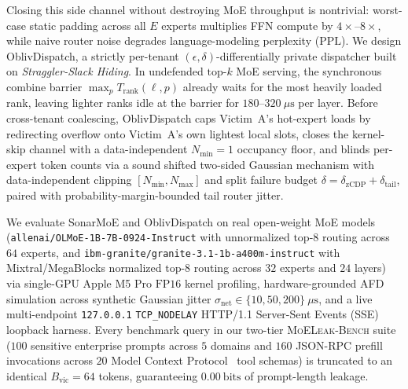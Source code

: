 \documentclass[final,5p,times,twocolumn]{elsarticle}
\def\SM{SonarMoE}%
\def\OD{OblivDispatch}%
\theoremstyle{definition}
\theoremstyle{remark}
\newcommand{\SM}{\textsc{SonarMoE}}
\newcommand{\OD}{\textsc{OblivDispatch}}
\newcommand{\MLB}{\textsc{MoELeak-Bench}}
\begin{document}
Closing this side channel without destroying MoE throughput is nontrivial: worst-case static padding across all $E$ experts multiplies FFN compute by $4\times$--$8\times$, while naive router noise degrades language-modeling perplexity ($\mathrm{PPL}$). We design \OD{}, a strictly per-tenant $(\epsilon, \delta)$-differentially private dispatcher built on \emph{Straggler-Slack Hiding}. In undefended $\text{top-}k$ MoE serving, the synchronous combine barrier $\max_{p} T_{\mathrm{rank}}(\ell, p)$ already waits for the most heavily loaded rank, leaving lighter ranks idle at the barrier for $180$--$320~\mu\mathrm{s}$ per layer. Before cross-tenant coalescing, \OD{} caps Victim~A's hot-expert loads by redirecting overflow onto Victim~A's own lightest local slots, closes the kernel-skip channel with a data-independent $N_{\min} = 1$ occupancy floor, and blinds per-expert token counts via a sound shifted two-sided Gaussian mechanism with data-independent clipping $[N_{\min}, N_{\max}]$ and split failure budget $\delta = \delta_{\mathrm{zCDP}} + \delta_{\mathrm{tail}}$, paired with probability-margin-bounded tail router jitter.

We evaluate \SM{} and \OD{} on real open-weight MoE models (\texttt{allenai/OLMoE-1B-7B-0924-Instruct} with unnormalized $\text{top-}8$ routing across $64$ experts, and \texttt{ibm-granite/\allowbreak granite-3.1-1b-a400m-instruct} with Mixtral/MegaBlocks normalized $\text{top-}8$ routing across $32$ experts and $24$ layers) via single-GPU Apple M5 Pro $\mathrm{FP16}$ kernel profiling, hardware-grounded AFD simulation across synthetic Gaussian jitter $\sigma_{\mathrm{net}} \in \{10, 50, 200\}~\mu\mathrm{s}$, and a live multi-endpoint \texttt{127.0.0.1} \texttt{TCP\_NODELAY} HTTP/1.1 Server-Sent Events (SSE) loopback harness. Every benchmark query in our two-tier \MLB{} suite ($100$ sensitive enterprise prompts across $5$ domains and $160$ JSON-RPC prefill invocations across $20$ Model Context Protocol~\cite{anthropic2024mcp,patil2024bfcl} tool schemas) is truncated to an identical $B_{\mathrm{vic}} = 64$ tokens, guaranteeing $0.00~\mathrm{bits}$ of prompt-length leakage.
\end{document}
